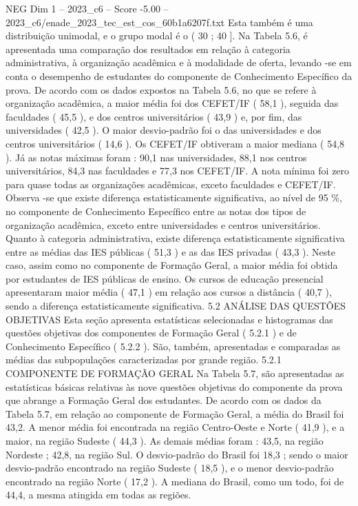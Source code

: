 \begin{textsample}{NEG Dim 1 – 2023\_c6 – Score -5.00 – 2023\_c6/enade\_2023\_tec\_est\_cos\_60b1a6207f.txt}
Esta também é uma distribuição unimodal, e o grupo modal é o ( 30 ; 40 ].
Na Tabela 5.6, é apresentada uma comparação dos resultados em relação à categoria administrativa, à organização acadêmica e à modalidade de oferta, levando -se em conta o desempenho de estudantes do componente de Conhecimento Específico da prova.
De acordo com os dados expostos na Tabela 5.6, no que se refere à organização acadêmica, a maior média foi dos CEFET/IF ( 58,1 ), seguida das faculdades ( 45,5 ), e dos centros universitários ( 43,9 ) e, por fim, das universidades ( 42,5 ).
O maior desvio-padrão foi o das universidades e dos centros universitários ( 14,6 ).
Os CEFET/IF obtiveram a maior mediana ( 54,8 ).
Já as notas máximas foram : 90,1 nas universidades, 88,1 nos centros universitários, 84,3 nas faculdades e 77,3 nos CEFET/IF.
A nota mínima foi zero para quase todas as organizações acadêmicas, exceto faculdades e CEFET/IF.
Observa -se que existe diferença estatisticamente significativa, ao nível de 95 \%, no componente de Conhecimento Específico entre as notas dos tipos de organização acadêmica, exceto entre universidades e centros universitários.
Quanto à categoria administrativa, existe diferença estatisticamente significativa entre as médias das IES públicas ( 51,3 ) e as das IES privadas ( 43,3 ).
Neste caso, assim como no componente de Formação Geral, a maior média foi obtida por estudantes de IES públicas de ensino.
Os cursos de educação presencial apresentaram maior média ( 47,1 ) em relação aos cursos a distância ( 40,7 ), sendo a diferença estatisticamente significativa. 5.2 ANÁLISE DAS QUESTÕES OBJETIVAS Esta seção apresenta estatísticas selecionadas e histogramas das questões objetivas dos componentes de Formação Geral ( 5.2.1 ) e de Conhecimento Específico ( 5.2.2 ).
São, também, apresentadas e comparadas as médias das subpopulações caracterizadas por grande região. 5.2.1 COMPONENTE DE FORMAÇÃO GERAL Na Tabela 5.7, são apresentadas as estatísticas básicas relativas às nove questões objetivas do componente da prova que abrange a Formação Geral dos estudantes.
De acordo com os dados da Tabela 5.7, em relação ao componente de Formação Geral, a média do Brasil foi 43,2.
A menor média foi encontrada na região Centro-Oeste e Norte ( 41,9 ), e a maior, na região Sudeste ( 44,3 ).
As demais médias foram : 43,5, na região Nordeste ; 42,8, na região Sul.
O desvio-padrão do Brasil foi 18,3 ; sendo o maior desvio-padrão encontrado na região Sudeste ( 18,5 ), e o menor desvio-padrão encontrado na região Norte ( 17,2 ).
A mediana do Brasil, como um todo, foi de 44,4, a mesma atingida em todas as regiões.

\end{textsample}
